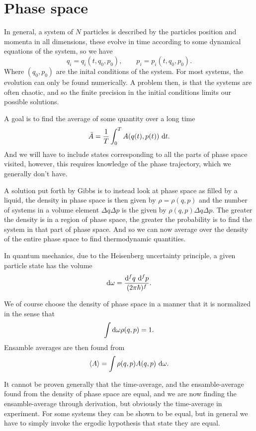 \documentclass[a4paper, 11pt, notitlepage, english]{article}
\renewcommand{\d}{{\rm d}}
\begin{document}
\section*{Phase space}

In general, a system of $N$ particles is described by the particles position and momenta in all dimensions, these evolve in time according to some dynamical equations of the system, so we have
$$q_i = q_i(t, q_0, p_0), \qquad p_i = p_i(t,q_0,p_0).$$
Where $(q_0, p_0)$ are the inital conditions of the system. For most systems, the evolution can only be found numerically. A problem then, is that the systems are often chaotic, and so the finite precision in the initial conditions limits our possible solutions.

A goal is to find the average of some quantity over a long time
$$\bar{A} = \frac{1}{T}\int_0^T A(q(t), p(t)) \ \d t.$$
And we will have to include states corresponding to all the parts of phase space visited, however, this requires knowledge of the phase trajectory, which we generally don't have.

A solution put forth by Gibbs is to instead look at phase space as filled by a liquid, the density in phase space is then given by $\rho = \rho(q,p)$ and the number of systems in a volume element $\Delta q \Delta p$ is the given by $\rho(q,p)\Delta q \Delta p$. The greater the density is in a region of phase space, the greater the probability is to find the system in that part of phase space. And so we can now average over the density of the entire phase space to find thermodynamic quantities.

In quantum mechanics, due to the Heisenberg uncertainty principle, a given particle state has the volume
$$\d\omega = \frac{\d^f q\  \d^f p}{(2\pi \hbar)^f}.$$

We of course choose the density of phase space in a manner that it is normalized in the sense that
$$\int \d \omega \rho(q,p) = 1.$$
Ensamble averages are then found from
$$\langle A \rangle = \int \rho(q,p) A(q,p) \ \d \omega.$$

It cannot be proven generally that the time-average, and the ensamble-average found from the density of phase space are equal, and we are now finding the ensamble-average through derivation, but obviously the time-average in experiment. For some systems they can be shown to be equal, but in general we have to simply invoke the ergodic hypothesis that state they are equal.
\end{document}
